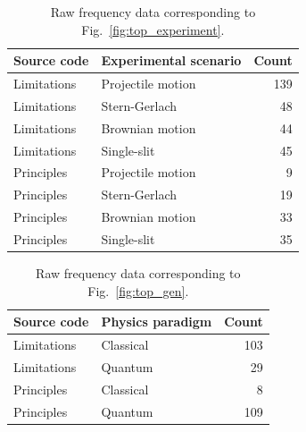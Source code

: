 \documentclass[english,aps,prstper,reprint,showpacs,longbibliography,superscriptaddress,nofootinbib]{revtex4-2}
\begin{document}
\begin{table}[tb] 
  \caption{Raw frequency data corresponding to Fig.~\ref{fig:top_experiment}.}
  \label{ta:top_experiment}
  \begin{ruledtabular}
    \begin{tabular}{llr}
    Source code & Experimental scenario & Count\\
    \hline
    Limitations & Projectile motion & 139\\
    Limitations & Stern-Gerlach & 48\\
    Limitations & Brownian motion & 44\\
    Limitations & Single-slit & 45\\
    Principles & Projectile motion & 9\\
    Principles & Stern-Gerlach & 19\\
    Principles & Brownian motion & 33\\
    Principles & Single-slit & 35\\
    \end{tabular}
  \end{ruledtabular}
\end{table}

\begin{table}[tb] 
  \caption{Raw frequency data corresponding to Fig.~\ref{fig:top_gen}.}
  \label{ta:top_gen}
  \begin{ruledtabular}
    \begin{tabular}{llr}
    Source code & Physics paradigm & Count\\
    \hline
    Limitations & Classical & 103\\
    Limitations & Quantum & 29\\
    Principles & Classical & 8 \\
    Principles & Quantum & 109\\
    \end{tabular}
  \end{ruledtabular}
\end{table}

 
\end{document}
